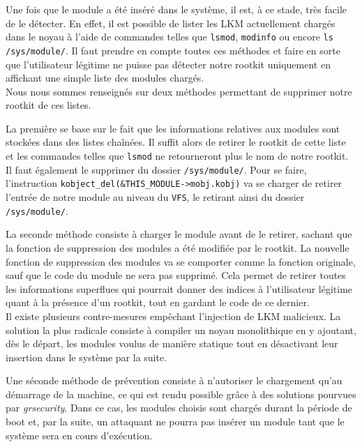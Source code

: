 \documentclass[11pt]{article}
\begin{document}
        Une fois que le module a été inséré dans le système, il est, à ce stade, très facile de le détecter. En effet, il est possible de lister les LKM actuellement chargés dans le noyau à l'aide de commandes telles que \texttt{lsmod}, \texttt{modinfo} ou encore \texttt{ls /sys/module/}. Il faut prendre en compte toutes ces méthodes et faire en sorte que l'utilisateur légitime ne puisse pas  détecter notre rootkit uniquement en affichant une simple liste des modules chargés. \\

        Nous nous sommes renseignés sur deux méthodes permettant de supprimer notre rootkit de ces listes.

        La première se base sur le fait que les informations relatives aux modules sont stockées dans des listes chaînées. Il suffit alors de retirer le rootkit de cette liste et les commandes telles que \texttt{lsmod} ne retourneront plus le nom de notre rootkit. Il faut également le supprimer du dossier \texttt{/sys/module/}. Pour se faire, l'instruction \texttt{kobject\_del(\&THIS\_MODULE->mobj.kobj)} va se charger de retirer l'entrée de notre module au niveau du \texttt{VFS}, le retirant ainsi du dossier \texttt{/sys/module/}.

        La seconde méthode consiste à charger le module avant de le retirer, sachant que la fonction de suppression des modules a été modifiée par le rootkit. La nouvelle fonction de suppression des modules va se comporter comme la fonction originale, sauf que le code du module ne sera pas supprimé. Cela permet de retirer toutes les informations superflues qui pourrait donner des indices à l'utilisateur légitime quant à la présence d'un rootkit, tout en gardant le code de ce dernier. \\
        
        Il existe plusieurs contre-mesures empêchant l'injection de LKM malicieux. La solution la plus radicale consiste à compiler un noyau monolithique en y ajoutant, dès le départ, les modules voulus de manière statique tout en désactivant leur insertion dans le système par la suite.

        Une séconde méthode de prévention consiste à n'autoriser le chargement qu'au démarrage de la machine, ce qui est rendu possible grâce à des solutions pourvues par \textit{grsecurity}. Dans ce cas, les modules choisis sont chargés durant la période de boot et, par la suite, un attaquant ne pourra pas insérer un module tant que le système sera en cours d'exécution.
\end{document}
